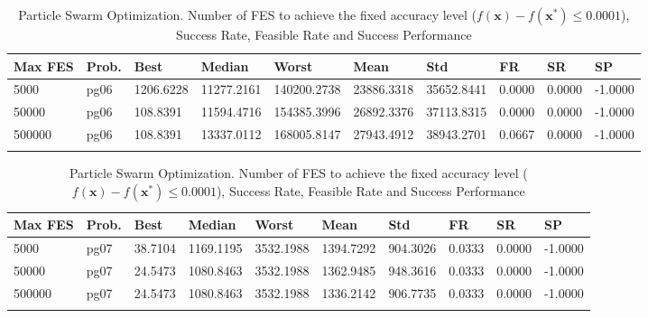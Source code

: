 \documentclass[10pt, a4paper]{book}
\begin{document}
\begin{center}
\begin{longtable}{l l l l l l l l l l}
\textbf{Max FES} & \textbf{Prob.} & \textbf{Best} & \textbf{Median} & \textbf{Worst} & \textbf{Mean} & \textbf{Std} & \textbf{FR} & \textbf{SR} & \textbf{SP} \\
\hline
5000 & pg06 & 1206.6228 & 11277.2161 & 140200.2738 & 23886.3318 & 35652.8441 & 0.0000 & 0.0000 & -1.0000 \\
50000 & pg06 & 108.8391 & 11594.4716 & 154385.3996 & 26892.3376 & 37113.8315 & 0.0000 & 0.0000 & -1.0000 \\
500000 & pg06 & 108.8391 & 13337.0112 & 168005.8147 & 27943.4912 & 38943.2701 & 0.0667 & 0.0000 & -1.0000 \\

\caption{ Particle Swarm Optimization. Number of FES to achieve the fixed accuracy level ($f(\mathbf{x}) - f(\mathbf{x}^{*}) \leq 0.0001$), Success Rate, Feasible Rate and Success Performance }
\end{longtable}
\end{center}

\begin{center}
\begin{longtable}{l l l l l l l l l l}
\textbf{Max FES} & \textbf{Prob.} & \textbf{Best} & \textbf{Median} & \textbf{Worst} & \textbf{Mean} & \textbf{Std} & \textbf{FR} & \textbf{SR} & \textbf{SP} \\
\hline
5000 & pg07 & 38.7104 & 1169.1195 & 3532.1988 & 1394.7292 & 904.3026 & 0.0333 & 0.0000 & -1.0000 \\
50000 & pg07 & 24.5473 & 1080.8463 & 3532.1988 & 1362.9485 & 948.3616 & 0.0333 & 0.0000 & -1.0000 \\
500000 & pg07 & 24.5473 & 1080.8463 & 3532.1988 & 1336.2142 & 906.7735 & 0.0333 & 0.0000 & -1.0000 \\

\caption{ Particle Swarm Optimization. Number of FES to achieve the fixed accuracy level ($f(\mathbf{x}) - f(\mathbf{x}^{*}) \leq 0.0001$), Success Rate, Feasible Rate and Success Performance }
\end{longtable}
\end{center}
\end{document}
